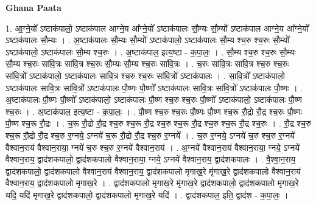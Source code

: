 \documentclass[17pt]{extarticle}
\begin{document}
\textbf{Ghana Paata } \newline

1. आ॒ग्ने॒यो᳚ ऽष्टाक॑पालो॒ ऽष्टाक॑पाल आग्ने॒य आ᳚ग्ने॒यो᳚ ऽष्टाक॑पालः सौ॒म्यः सौ॒म्यो᳚ ऽष्टाक॑पाल आग्ने॒य आ᳚ग्ने॒यो᳚ ऽष्टाक॑पालः सौ॒म्यः । . अ॒ष्टाक॑पालः सौ॒म्यः सौ॒म्यो᳚ ऽष्टाक॑पालो॒ ऽष्टाक॑पालः सौ॒म्य श्च॒रु श्च॒रुः सौ॒म्यो᳚ ऽष्टाक॑पालो॒ ऽष्टाक॑पालः सौ॒म्य श्च॒रुः । . अ॒ष्टाक॑पाल॒ इत्य॒ष्टा - क॒पा॒लः॒ । . सौ॒म्य श्च॒रु श्च॒रुः सौ॒म्यः सौ॒म्य श्च॒रुः सा॑वि॒त्रः सा॑वि॒त्र श्च॒रुः सौ॒म्यः सौ॒म्य श्च॒रुः सा॑वि॒त्रः । . च॒रुः सा॑वि॒त्रः सा॑वि॒त्र श्च॒रु श्च॒रुः सा॑वि॒त्रो᳚ ऽष्टाक॑पालो॒ ऽष्टाक॑पालः सावि॒त्र श्च॒रु श्च॒रुः सा॑वि॒त्रो᳚ ऽष्टाक॑पालः । . सा॒वि॒त्रो᳚ ऽष्टाक॑पालो॒ ऽष्टाक॑पालः सावि॒त्रः सा॑वि॒त्रो᳚ ऽष्टाक॑पालः पौ॒ष्णः पौ॒ष्णो᳚ ऽष्टाक॑पालः सावि॒त्रः सा॑वि॒त्रो᳚ ऽष्टाक॑पालः पौ॒ष्णः । . अ॒ष्टाक॑पालः पौ॒ष्णः पौ॒ष्णो᳚ ऽष्टाक॑पालो॒ ऽष्टाक॑पालः पौ॒ष्ण श्च॒रु श्च॒रुः पौ॒ष्णो᳚ ऽष्टाक॑पालो॒ ऽष्टाक॑पालः पौ॒ष्ण श्च॒रुः । . अ॒ष्टाक॑पाल॒ इत्य॒ष्टा - क॒पा॒लः॒ । . पौ॒ष्ण श्च॒रु श्च॒रुः पौ॒ष्णः पौ॒ष्ण श्च॒रू रौ॒द्रो रौ॒द्र श्च॒रुः पौ॒ष्णः पौ॒ष्ण श्च॒रू रौ॒द्रः । . च॒रू रौ॒द्रो रौ॒द्र श्च॒रु श्च॒रू रौ॒द्र श्च॒रु श्च॒रू रौ॒द्र श्च॒रु श्च॒रू रौ॒द्र श्च॒रुः । . रौ॒द्र श्च॒रु श्च॒रू रौ॒द्रो रौ॒द्र श्च॒रु र॒ग्नये॒ ऽग्नये॑ च॒रू रौ॒द्रो रौ॒द्र श्च॒रु र॒ग्नये᳚ । . च॒रु र॒ग्नये॒ ऽग्नये॑ च॒रु श्च॒रु र॒ग्नये॑ वैश्वान॒राय॑ वैश्वान॒राया॒ ग्नये॑ च॒रु श्च॒रु र॒ग्नये॑ वैश्वान॒राय॑ । . अ॒ग्नये॑ वैश्वान॒राय॑ वैश्वान॒राया॒ ग्नये॒ ऽग्नये॑ वैश्वान॒राय॒ द्वाद॑शकपालो॒ द्वाद॑शकपालो वैश्वान॒राया॒ ग्नये॒ ऽग्नये॑ वैश्वान॒राय॒ द्वाद॑शकपालः । . वै॒श्वा॒न॒राय॒ द्वाद॑शकपालो॒ द्वाद॑शकपालो वैश्वान॒राय॑ वैश्वान॒राय॒ द्वाद॑शकपालो मृगाख॒रे मृ॑गाख॒रे द्वाद॑शकपालो वैश्वान॒राय॑ वैश्वान॒राय॒ द्वाद॑शकपालो मृगाख॒रे । . द्वाद॑शकपालो मृगाख॒रे मृ॑गाख॒रे द्वाद॑शकपालो॒ द्वाद॑शकपालो मृगाख॒रे यदि॒ यदि॑ मृगाख॒रे द्वाद॑शकपालो॒ द्वाद॑शकपालो मृगाख॒रे यदि॑ । . द्वाद॑शकपाल॒ इति॒ द्वाद॑श - क॒पा॒लः॒ । \newline
\end{document}
